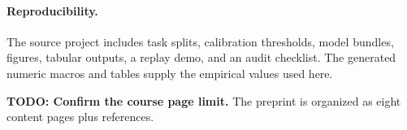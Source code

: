 \documentclass{article}
\begin{document}
\paragraph{Reproducibility.}
The source project includes task splits, calibration thresholds, model bundles, figures, tabular outputs, a replay demo, and an audit checklist. The generated numeric macros and tables supply the empirical values used here.

\textbf{TODO: Confirm the course page limit.} The preprint is organized as eight content pages plus references.

\clearpage


\end{document}

